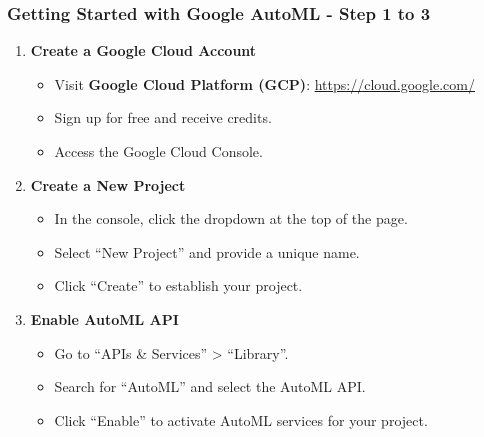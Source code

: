 \documentclass[aspectratio=169]{beamer}
\begin{document}
\begin{frame}[fragile]
    \frametitle{Getting Started with Google AutoML - Step 1 to 3}
    \begin{enumerate}
        \item \textbf{Create a Google Cloud Account}
        \begin{itemize}
            \item Visit \textbf{Google Cloud Platform (GCP)}: 
            \href{https://cloud.google.com/}{https://cloud.google.com/}
            \item Sign up for free and receive credits.
            \item Access the Google Cloud Console.
        \end{itemize}

        \item \textbf{Create a New Project}
        \begin{itemize}
            \item In the console, click the dropdown at the top of the page.
            \item Select “New Project” and provide a unique name.
            \item Click “Create” to establish your project.
        \end{itemize}
        
        \item \textbf{Enable AutoML API}
        \begin{itemize}
            \item Go to “APIs \& Services” > “Library”.
            \item Search for “AutoML” and select the AutoML API.
            \item Click “Enable” to activate AutoML services for your project.
        \end{itemize}
    \end{enumerate}
\end{frame}
\end{document}
